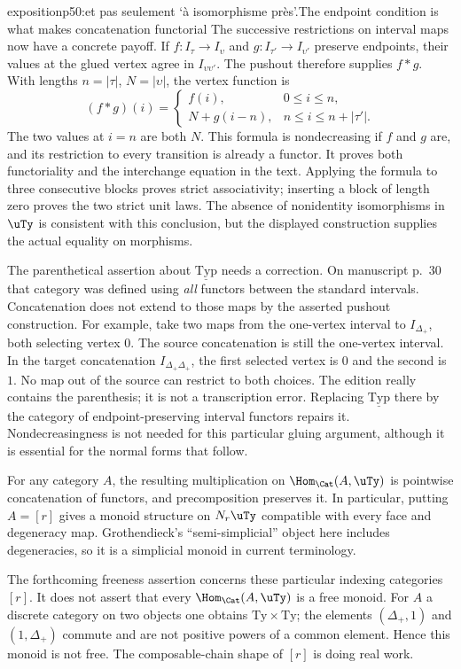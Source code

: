 \begin{dcomment}{exposition}{p50:et pas seulement `à isomorphisme près'.}{The endpoint condition is what makes concatenation functorial}
The successive restrictions on interval maps now have a concrete payoff. If $f:I_\tau\to I_\upsilon$ and $g:I_{\tau'}\to I_{\upsilon'}$ preserve endpoints, their values at the glued vertex agree in $I_{\upsilon\upsilon'}$. The pushout therefore supplies $f*g$. With lengths $n=|\tau|$, $N=|\upsilon|$, the vertex function is
\[
 (f*g)(i)=
 \begin{cases}
 f(i),&0\leq i\leq n,\\
 N+g(i-n),&n\leq i\leq n+|\tau'|.
 \end{cases}
\]
The two values at $i=n$ are both $N$. This formula is nondecreasing if $f$ and $g$ are, and its restriction to every transition is already a functor. It proves both functoriality and the interchange equation in the text. Applying the formula to three consecutive blocks proves strict associativity; inserting a block of length zero proves the two strict unit laws. The absence of nonidentity isomorphisms in $\uTy$ is consistent with this conclusion, but the displayed construction supplies the actual equality on morphisms.

The parenthetical assertion about $\underline{\mathrm{Typ}}$ needs a correction. On manuscript p.~30 that category was defined using \emph{all} functors between the standard intervals. Concatenation does not extend to those maps by the asserted pushout construction. For example, take two maps from the one-vertex interval to $I_{\Delta_+}$, both selecting vertex $0$. The source concatenation is still the one-vertex interval. In the target concatenation $I_{\Delta_+\Delta_+}$, the first selected vertex is $0$ and the second is $1$. No map out of the source can restrict to both choices. The edition really contains the parenthesis; it is not a transcription error. Replacing $\underline{\mathrm{Typ}}$ there by the category of endpoint-preserving interval functors repairs it. Nondecreasingness is not needed for this particular gluing argument, although it is essential for the normal forms that follow.

For any category $A$, the resulting multiplication on $\Hom_{\Cat}(A,\uTy)$ is pointwise concatenation of functors, and precomposition preserves it. In particular, putting $A=[r]$ gives a monoid structure on $N_r\uTy$ compatible with every face and degeneracy map. Grothendieck's ``semi-simplicial'' object here includes degeneracies, so it is a simplicial monoid in current terminology.

The forthcoming freeness assertion concerns these particular indexing categories $[r]$. It does not assert that every $\Hom_{\Cat}(A,\uTy)$ is a free monoid. For $A$ a discrete category on two objects one obtains $\mathrm{Ty}\times\mathrm{Ty}$; the elements $(\Delta_+,1)$ and $(1,\Delta_+)$ commute and are not positive powers of a common element. Hence this monoid is not free. The composable-chain shape of $[r]$ is doing real work.
\end{dcomment}

